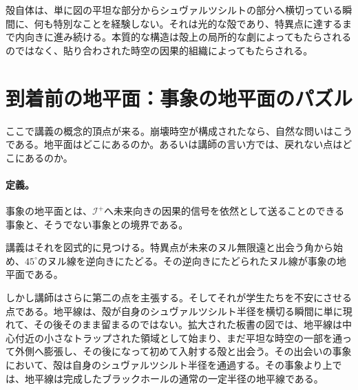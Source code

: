 殻自体は、単に図の平坦な部分からシュヴァルツシルトの部分へ横切っている瞬間に、何も特別なことを経験しない。それは光的な殻であり、特異点に達するまで内向きに進み続ける。本質的な構造は殻上の局所的な劇によってもたらされるのではなく、貼り合わされた時空の因果的組織によってもたらされる。

\begin{classroomqa}
\end{classroomqa}

\section{到着前の地平面：事象の地平面のパズル}

ここで講義の概念的頂点が来る。崩壊時空が構成されたなら、自然な問いはこうである。地平面はどこにあるのか。あるいは講師の言い方では、戻れない点はどこにあるのか。

\paragraph{定義。} 事象の地平面とは、\(\mathcal{I}^+\)へ未来向きの因果的信号を依然として送ることのできる事象と、そうでない事象との境界である。

講義はそれを図式的に見つける。特異点が未来のヌル無限遠と出会う角から始め、\(45^\circ\)のヌル線を逆向きにたどる。その逆向きにたどられたヌル線が事象の地平面である。

しかし講師はさらに第二の点を主張する。そしてそれが学生たちを不安にさせる点である。地平線は、殻が自身のシュヴァルツシルト半径を横切る瞬間に単に現れて、その後そのまま留まるのではない。拡大された板書の図では、地平線は中心付近の小さなトラップされた領域として始まり、まだ平坦な時空の一部を通って外側へ膨張し、その後になって初めて入射する殻と出会う。その出会いの事象において、殻は自身のシュヴァルツシルト半径を通過する。その事象より上では、地平線は完成したブラックホールの通常の一定半径の地平線である。

